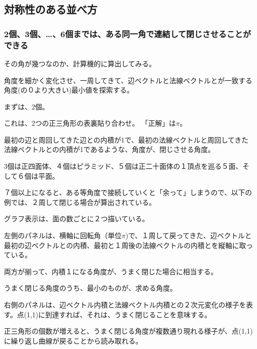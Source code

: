 \documentclass[]{article}
\begin{document}
\subsection{対称性のある並べ方}\label{ux5bfeux79f0ux6027ux306eux3042ux308bux4e26ux3079ux65b9}

\subsubsection{2個、3個、\ldots{}、6個までは、ある同一角で連結して閉じさせることができる}\label{ux500b3ux500b6ux500bux307eux3067ux306fux3042ux308bux540cux4e00ux89d2ux3067ux9023ux7d50ux3057ux3066ux9589ux3058ux3055ux305bux308bux3053ux3068ux304cux3067ux304dux308b}

その角が幾つなのか、計算機的に算出してみる。

角度を細かく変化させ、一周してきて、辺ベクトルと法線ベクトルとが一致する角度(の０より大きい)最小値を探索する。

まずは、2個。

これは、2つの正三角形の表裏貼り合わせ。 「正解」は\(\pi\)。

最初の辺と周回してきた辺との内積が1で、最初の法線ベクトルと周回してきた法線ベクトルとの内積が1であるような、角度が、閉じさせる角度。

3個は正四面体、４個はピラミッド、５個は正二十面体の１頂点を巡る５面、そして６個は平面。

７個以上になると、ある等角度で接続していくと「余って」しまうので、以下の例では、２周して閉じる場合が算出されている。

グラフ表示は、面の数ごとに２つ描いている。

左側のパネルは、横軸に回転角（単位\(\pi\))で、１周して戻ってきた、辺ベクトルと最初の辺ベクトルとの内積、最初と１周後の法線ベクトルの内積とを縦軸に取っている。

両方が揃って、内積１になる角度が、うまく閉じた場合に相当する。

うまく閉じる角度のうち、最小のものが、求める角度。

右側のパネルは、辺ベクトル内積と法線ベクトル内積との２次元変化の様子を表す。点(1,1)に到達すれば、それは、うまく閉じることを意味する。

正三角形の個数が増えると、うまく閉じる角度が複数通り現れる様子が、点(1,1)に繰り返し曲線が戻ることから読み取れる。
\end{document}
